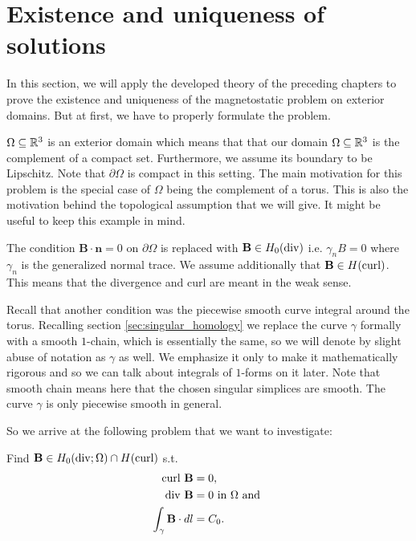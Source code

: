 \documentclass[../main.tex]{subfiles}
\begin{document}
\section{Existence and uniqueness of solutions}\label{sec:existence_and_uniqueness}

In this section, we will apply the developed theory of the preceding chapters
to prove the existence and uniqueness of the magnetostatic problem 
on exterior domains. But at first, we have to properly formulate the problem.

$\Omega \subseteq \mathbb{R}^3$ is an exterior domain which means that 
that our domain $\Omega \subseteq \mathbb{R}^3$
is the complement of a compact set. Furthermore, we assume its boundary to be 
Lipschitz. Note that $\partial \Omega$ is compact in this setting.
The main motivation for this problem is 
the special case of $\Omega$ being the complement of a torus. 
This is also the motivation behind the
topological assumption that we will give. It might be useful to keep this
example in mind.

The condition $\mathbf{B}\cdot \mathbf{n} = 0$ on $\partial\Omega$ is replaced
with $\mathbf{B} \in H_0(\operatorname{div})$ i.e. $\gamma_n B = 0$ where 
$\gamma_n$ is the generalized normal trace. We assume additionally that 
$\mathbf{B} \in H(\operatorname{curl})$. This means that the divergence and curl are meant in 
the weak sense.

Recall that another condition was the piecewise smooth curve integral around the torus.
Recalling section \ref{sec:singular_homology} we replace the curve $\gamma$
formally with a smooth $1$-chain, which is essentially the same, so we will 
denote by slight abuse of notation as $\gamma$ as well. We emphasize 
it only to make it mathematically rigorous and so we can talk about integrals 
of $1$-forms on it later. Note that smooth chain means here that the chosen 
singular simplices are smooth. The curve $\gamma$ is only piecewise smooth in 
general.

So we arrive at the following problem that we want to investigate:
\begin{problem}\label{prob:magnetostatic_problem}
    Find $\mathbf{B} \in H_0(\operatorname{div};\Omega) \cap H(\operatorname{curl})$ s.t.
    \begin{align}
        \operatorname{curl} \, \mathbf{B} &= 0, \\ 
        \operatorname{div} \, \mathbf{B}  &= 0 \text{ in } \Omega \text{ and }\\
        \int_\gamma \mathbf{B} \cdot dl &= C_0.
    \end{align}
\end{problem}
\end{document}
